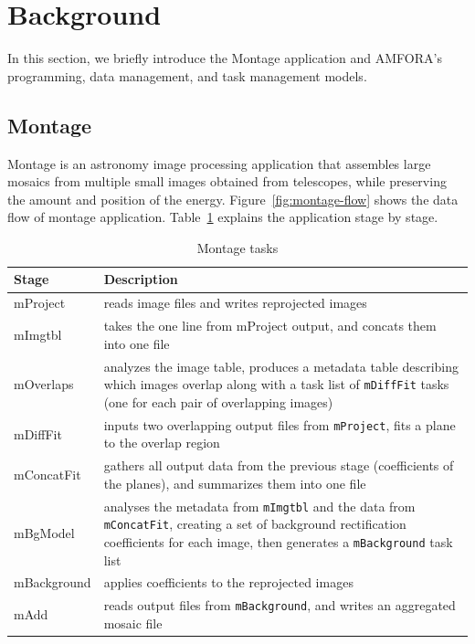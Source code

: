 \documentclass{sig-alternate}
\begin{document}
\section{Background}
\label{sec:background}
In this section, we briefly introduce the Montage application and AMFORA's programming, data management, and task management models.

\subsection{Montage}
Montage is an astronomy image processing application that assembles large mosaics from multiple small images obtained from telescopes, while preserving the amount and position of the energy. 
Figure~\ref{fig:montage-flow} shows the data flow of montage application.
Table~\ref{tb:Montage} explains the application stage by stage.

\begin{table}[h]
    \caption{Montage tasks}
   \begin{small}
    \begin{tabular}{ | p{1.8cm} | p{5.7cm} |}
    \hline
    Stage & Description  \\ \hline \hline
    mProject &  reads image files and writes reprojected images\\ \hline
    mImgtbl &  takes the one line from mProject output, and concats them into one file\\ \hline
    mOverlaps &  analyzes the image table, produces a metadata table describing which images overlap along with a task list of {\tt mDiffFit} tasks (one for each pair of overlapping images) \\ \hline
    mDiffFit &  inputs two overlapping output files from {\tt mProject}, fits a plane to the overlap region \\ \hline
    mConcatFit &  gathers all output data from the previous stage (coefficients of the planes), and summarizes them into one file \\ \hline
    mBgModel &  analyses the metadata from {\tt mImgtbl} and the data from {\tt mConcatFit}, creating a set of background rectification coefficients for each image, then generates a {\tt mBackground} task list \\ \hline
    mBackground &  applies coefficients to the reprojected images\\ \hline
    mAdd &  reads output files from {\tt mBackground}, and writes an aggregated mosaic file \\ \hline
    \end{tabular}
    \end{small}
      \label{tb:Montage}
\end{table}
\end{document}
